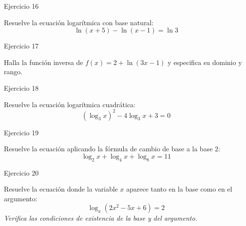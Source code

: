 \documentclass[aspectratio=169]{beamer}
\begin{document}
\begin{frame}{Ejercicio 16}
  \begin{mwejercicio}
    Resuelve la ecuación logarítmica con base natural:
    $$\ln(x + 5) - \ln(x - 1) = \ln 3$$
  \end{mwejercicio}
  \vspace{3.5cm}
\end{frame}
\begin{frame}{Ejercicio 17}
  \begin{mwejercicio}
    Halla la función inversa de $f(x) = 2 + \ln(3x - 1)$ y especifica su dominio y rango.
  \end{mwejercicio}
  \vspace{3.5cm}
\end{frame}
\begin{frame}{Ejercicio 18}
  \begin{mwejercicio}
    Resuelve la ecuación logarítmica cuadrática:
    $$(\log_3 x)^2 - 4\log_3 x + 3 = 0$$
  \end{mwejercicio}
  \vspace{3.5cm}
\end{frame}
\begin{frame}{Ejercicio 19}
  \begin{mwejercicio}
    Resuelve la ecuación aplicando la fórmula de cambio de base a la base 2:
    $$\log_2 x + \log_4 x + \log_8 x = 11$$
  \end{mwejercicio}
  \vspace{3.5cm}
\end{frame}
\begin{frame}{Ejercicio 20}
  \begin{mwejercicio}
    Resuelve la ecuación donde la variable $x$ aparece tanto en la base como en el argumento:
    $$\log_x(2x^2 - 5x + 6) = 2$$
    \emph{Verifica las condiciones de existencia de la base y del argumento.}
  \end{mwejercicio}
  \vspace{3.5cm}
\end{frame}
\end{document}
